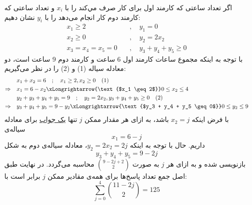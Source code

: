\p
اگر تعداد ساعتی که کارمند اول برای کار 
صرف مي‌كند را با $x_i$
 و تعداد ساعتی که کارمند دوم کار
انجام می‌دهد را با
 $y_i$
نشان ‌دهیم:
\begin{align*}
 x_1 \geq 2 \quad &, \quad y_1 = 0 \\
 x_2 \geq 0 \quad &, \quad y_2 = 2x_2 \\
 x_3=x_4=x_5=0 \quad &, \quad y_3  + y_4 + y_5 \geq 0 
\end{align*}
\p
با توجه به اینکه 
مجموع ساعات کارمند اول 6 ساعت و کارمند دوم 9 ساعت است، دو معادله سیاله 
(1) 
و
(2)
 را در نظر می‌گیریم:
\begin{align*}
&x_1 + x_2  = 6 \quad ;\quad x_1 \geq 2 , x_2 \geq  0 \quad (1)\\
 \Rightarrow \quad  &x_1 = 6 - x_2 \xLongrightarrow{\text{$x_1 \geq 2$}}  0 \leq x_2 \leq 4  \\
&y_2 + y_3 + y_4 + y_5 = 9\quad ;\quad y_2 = 2x_2 , y_3 + y_4 + y_5  \geq 0\quad (2)\\
 \Rightarrow\quad &y_3 + y_4 + y_5 = 9 - y_2 \xLongrightarrow{\text{$y_3 + y_4 + y_5  \geq 0$}} 0 \leq y_2 \leq 9 
\end{align*}
\p
با فرض اینکه
$x_2 = j$
باشد،
به ازای هر مقدار ممکن  
$j$
تنها
\underline{یک جواب}
برای
معادله سیاله‌ی 
 $$x_1 = 6 - j$$
 داریم.
 حال با توجه به اینکه 
 $y_2 = 2x_2 = 2j$،
 معادله‌ سیاله‌ی دوم به شكل 
 $$y_3 + y_4 + y_5 = 9 - 2j$$
 بازنویسی شده و به ازای هر 
 $j$
 به صورت
 \underline{ $\binom{9 - 2j + 2}{2}$}
 محاسبه می‌گردد.
\p
در نهایت طبق اصل جمع تعداد پاسخ‌ها برای همه‌ی مقادیر ممکن 
$j$
برابر است با: 
$$\sum_{j=0}^{4}\binom{11 - 2j}{2} = 125$$

